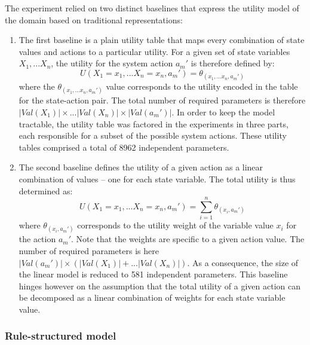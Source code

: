 The experiment relied on two distinct baselines that express the utility model of the domain based on traditional representations: \begin{enumerate}
\item The first baseline is a plain utility table that maps every combination of state values and actions to a particular utility.  For a given set of state variables $X_1,...X_n$, 
the utility for the system action $a_m'$ is therefore defined by: 
\begin{equation}
U(X_1=x_1,...X_n=x_n, a_m') = \theta_{(x_1,...x_n, a_m')}
\end{equation}
where the $\theta_{(x_1,...x_n, a_m')}$ value corresponds to the utility encoded in the table for the state-action pair. The total number of required parameters is therefore $|Val(X_1)| \times ... |Val(X_n)| \times |Val(a_m')|$. In order to keep the model tractable, the utility table was factored in the experiments in three parts, each responsible for a subset of the possible system actions. These utility tables comprised a total of 8962 independent parameters. 
\item The second baseline defines the utility of a given action as a linear combination of values -- one for each state variable.  The total utility is thus determined as:
\begin{equation}
U(X_1=x_1,...X_n=x_n, a_m') = \sum_{i=1}^{n} \theta_{(x_i, a_m')}
\end{equation}
where $\theta_{(x_i, a_m')}$ corresponds to the utility weight of the variable value $x_i$ for the action $a_m'$.  Note that the weights are specific to a given action value. The number of required parameters is here $|Val(a_m')| \times (|Val(X_1)| + ... |Val(X_n)|)$.  As a consequence, the size of the linear model is reduced to 581 independent parameters.  This baseline hinges however on the assumption that the total utility of a given action can be decomposed as a linear combination of weights for each state variable value.
\end{enumerate}

\subsubsection*{Rule-structured model}

